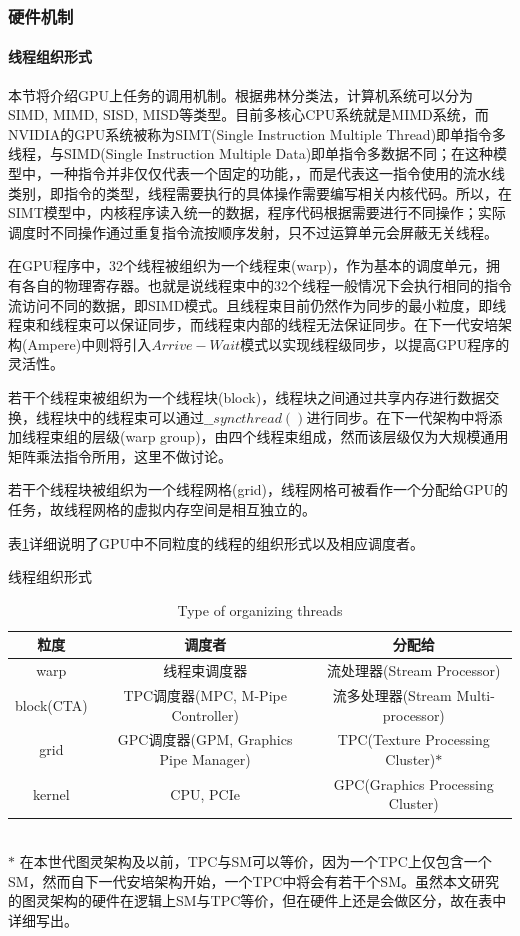 \subsubsection{硬件机制}
\paragraph{线程组织形式}
\par 本节将介绍GPU上任务的调用机制。根据弗林分类法\parencite{FLYNN}，计算机系统可以分为SIMD, MIMD, SISD, MISD等类型。目前多核心CPU系统就是MIMD系统，而NVIDIA的GPU系统被称为SIMT(Single Instruction Multiple Thread)即单指令多线程，与SIMD(Single Instruction Multiple Data)即单指令多数据不同；在这种模型中，一种指令并非仅仅代表一个固定的功能，，而是代表这一指令使用的流水线类别，即指令的类型，线程需要执行的具体操作需要编写相关内核代码。所以，在SIMT模型中，内核程序读入统一的数据，程序代码根据需要进行不同操作；实际调度时不同操作通过重复指令流按顺序发射，只不过运算单元会屏蔽无关线程。
\par 在GPU程序中，32个线程被组织为一个线程束(warp)，作为基本的调度单元，拥有各自的物理寄存器。也就是说线程束中的32个线程一般情况下会执行相同的指令流访问不同的数据，即SIMD模式。且线程束目前仍然作为同步的最小粒度，即线程束和线程束可以保证同步，而线程束内部的线程无法保证同步。在下一代安培架构(Ampere)中则将引入$ Arrive-Wait $模式以实现线程级同步，以提高GPU程序的灵活性。
\par 若干个线程束被组织为一个线程块(block)，线程块之间通过共享内存进行数据交换，线程块中的线程束可以通过$ \_\_syncthread() $进行同步。在下一代架构中将添加线程束组的层级(warp group)，由四个线程束组成，然而该层级仅为大规模通用矩阵乘法指令所用，这里不做讨论。
\par 若干个线程块被组织为一个线程网格(grid)，线程网格可被看作一个分配给GPU的任务，故线程网格的虚拟内存空间是相互独立的。
\par 表\ref{table-粒度}详细说明了GPU中不同粒度的线程的组织形式以及相应调度者。
\begin{table}
	\centering
	\renewcommand{\thetable}{\arabic{section}-\arabic{table} }
	\renewcommand{\tablename}{表}
	\caption{线程组织形式}
	\addtocounter{table}{-1}
	\renewcommand{\thetable}{\arabic{section}-\arabic{table} }
	\renewcommand{\tablename}{Table}
	\caption{Type of organizing threads}
	\begin{tabular}{ccc}
		\toprule
		粒度	&	调度者	& 	分配给 \\
		\midrule
		warp		&	线程束调度器	&	流处理器(Stream Processor)\\
		block(CTA)	&	TPC调度器(MPC, M-Pipe Controller)		  &		流多处理器(Stream Multi-processor)\\
		grid		&	GPC调度器(GPM, Graphics Pipe Manager)		  &		TPC(Texture Processing Cluster)$ * $\\
		kernel		&	CPU, PCIe			&		GPC(Graphics Processing Cluster)	\\	
		\bottomrule
	\end{tabular} \label{table-粒度}\\
	
	$ * $ 在本世代图灵架构及以前，TPC与SM可以等价，因为一个TPC上仅包含一个SM，然而自下一代安培架构开始，一个TPC中将会有若干个SM。虽然本文研究的图灵架构的硬件在逻辑上SM与TPC等价，但在硬件上还是会做区分，故在表中详细写出\parencite{BLOCKDIAG}。
\end{table}
